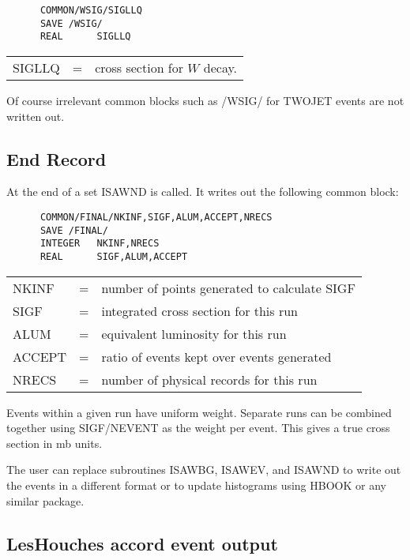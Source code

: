 \begin{verbatim}
      COMMON/WSIG/SIGLLQ
      SAVE /WSIG/
      REAL      SIGLLQ
\end{verbatim}
\begin{tabular}{lcl}
SIGLLQ             &=& cross section for $W$ decay.\\
\end{tabular}

      Of course irrelevant common blocks such as /WSIG/ for TWOJET
events are not written out.

\subsection{End Record} 

      At the end of a set ISAWND is called. It writes out the
following common block:
\begin{verbatim}
      COMMON/FINAL/NKINF,SIGF,ALUM,ACCEPT,NRECS
      SAVE /FINAL/
      INTEGER   NKINF,NRECS
      REAL      SIGF,ALUM,ACCEPT
\end{verbatim}
\begin{tabular}{lcl}
NKINF             &=& number of points generated to calculate SIGF\\
SIGF              &=& integrated cross section for this run\\
ALUM              &=& equivalent luminosity for this run\\
ACCEPT            &=& ratio of events kept over events generated\\
NRECS             &=& number of physical records for this run\\
\end{tabular}

      Events within a given run have uniform weight. Separate runs can
be combined together using SIGF/NEVENT as the weight per event. This
gives a true cross section in mb units.

      The user can replace subroutines ISAWBG, ISAWEV, and ISAWND to
write out the events in a different format or to update histograms
using HBOOK or any similar package.

\subsection{LesHouches accord event output}

